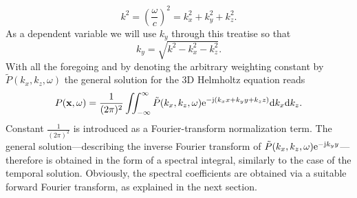 \begin{equation}
k^2 = \left( \frac{\omega}{c} \right)^2 = k_x^2 + k_y^2 + k_z^2.
\end{equation}
As a dependent variable we will use $k_y$ through this treatise so that
\begin{equation}
k_y = \sqrt{ k^2 - k_x^2 - k_z^2 }.
\end{equation}
With all the foregoing and by denoting the arbitrary weighting constant by $\tilde{P}(k_x,k_z, \omega)$ the general solution for the 3D Helmholtz equation reads
\begin{equation}
P(\mathbf{x},\omega) = \frac{1}{(2\pi)^2}\iint_{-\infty}^{\infty} \tilde{P}(k_x,k_z, \omega)  \mathrm{e}^{- \mathrm{j} \left( k_x x + k_y y + k_z z \right) }
\mathrm{d} k_x\mathrm{d} k_z.
\label{Eq:Theory:Helmholtz_Inverse_Fourier}
\end{equation}
Constant $\frac{1}{(2\pi)^2}$ is introduced as a Fourier-transform normalization term. 
The general solution---describing the inverse Fourier transform of $\tilde{P}(k_x,k_z, \omega)  \mathrm{e}^{- \mathrm{j} k_y y }$---therefore is obtained in the form of a spectral integral, similarly to the case of the temporal solution.
Obviously, the spectral coefficients are obtained via a suitable forward Fourier transform, as explained in the next section.


